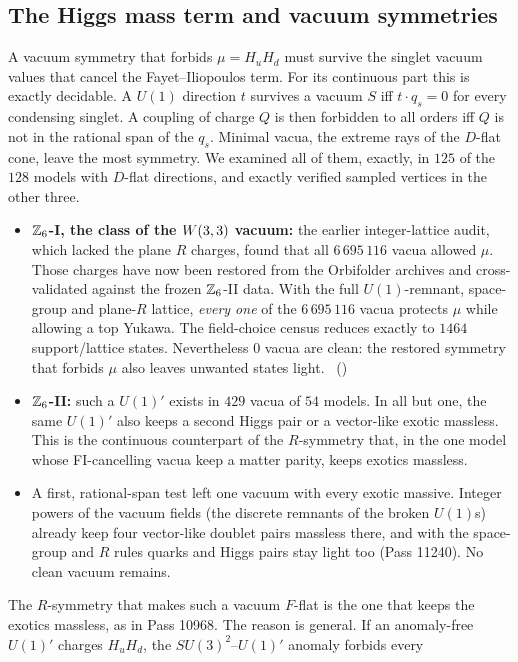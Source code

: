 \subsection{The Higgs mass term and vacuum symmetries}
\label{sec:mu}

A vacuum symmetry that forbids $\mu=H_uH_d$ must survive the singlet vacuum values that cancel the Fayet--Iliopoulos
term. For its continuous part this is exactly decidable. A $U(1)$ direction $t$ survives a vacuum $S$ iff
$t\cdot q_s=0$ for every condensing singlet. A coupling of charge $Q$ is then forbidden to all orders iff $Q$ is not
in the rational span of the $q_s$. Minimal vacua, the extreme rays of the $D$-flat cone, leave the most symmetry. We
examined all of them, exactly, in $125$ of the $128$ models with $D$-flat directions, and exactly verified sampled
vertices in the other three.
\begin{itemize}
\item \textbf{$\mathbb{Z}_6$-I, the class of the $W(3,3)$ vacuum:} the earlier integer-lattice audit, which lacked
  the plane $R$ charges, found that all $6\,695\,116$ vacua allowed $\mu$. Those charges have now been restored
  from the Orbifolder archives and cross-validated against the frozen $\mathbb{Z}_6$-II data. With the full
  $U(1)$-remnant, space-group and plane-$R$ lattice, \emph{every one} of the $6\,695\,116$ vacua protects $\mu$
  while allowing a top Yukawa. The field-choice census reduces exactly to $1464$ support/lattice states.
  Nevertheless $0$ vacua are clean: the restored symmetry that forbids $\mu$ also leaves unwanted states light.
  \tierC\ ()
\item \textbf{$\mathbb{Z}_6$-II:} such a $U(1)'$ exists in $429$ vacua of $54$ models. In all but one, the same $U(1)'$ also
  keeps a second Higgs pair or a vector-like exotic massless. This is the continuous counterpart of the $R$-symmetry
  that, in the one model whose FI-cancelling vacua keep a matter parity, keeps exotics massless.
\item A first, rational-span test left one vacuum with every exotic massive. Integer powers of the vacuum fields (the
  discrete remnants of the broken $U(1)$s) already keep four vector-like doublet pairs massless there, and with the
  space-group and $R$ rules quarks and Higgs pairs stay light too (Pass 11240). No clean vacuum remains.
\end{itemize}
The $R$-symmetry that makes such a vacuum $F$-flat is the one that keeps the exotics massless, as in Pass 10968. The reason is general. If an anomaly-free $U(1)'$ charges $H_uH_d$, the $SU(3)^2$--$U(1)'$ anomaly forbids every
